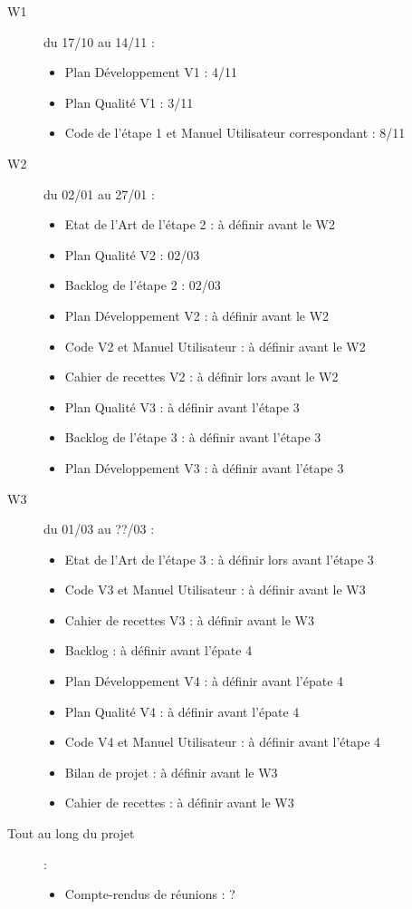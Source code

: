 \documentclass[10pt,a4paper]{article}
\begin{document}
\begin{description}

\item [W1] du 17/10 au 14/11 : 
\begin{itemize}
\item Plan Développement V1 : 4/11
\item Plan Qualité V1 : 3/11
\item Code de l'étape 1 et Manuel Utilisateur correspondant : 8/11
\end{itemize}

\item [W2] du 02/01 au 27/01  : 
\begin{itemize}
\item Etat de l'Art de l'étape 2 : à définir avant le W2
\item Plan Qualité V2 : 02/03
\item Backlog de l'étape 2 : 02/03
\item Plan Développement V2 : à définir avant le W2
\item Code V2 et Manuel Utilisateur : à définir avant le W2
\item Cahier de recettes V2 : à définir lors avant le W2
\item Plan Qualité V3 : à définir avant l'étape 3
\item Backlog de l'étape 3 : à définir avant l'étape 3
\item Plan Développement V3 : à définir avant l'étape 3
\end{itemize}

\item [W3] du 01/03 au ??/03  : 
\begin{itemize}
\item Etat de l'Art de l'étape 3  : à définir lors avant l'étape 3
\item Code V3 et Manuel Utilisateur : à définir avant le W3
\item Cahier de recettes V3 : à définir avant le W3
\item Backlog : à définir avant l'épate 4
\item Plan Développement V4 : à définir avant l'épate 4
\item Plan Qualité V4 : à définir avant l'épate 4
\item Code V4 et Manuel Utilisateur : à définir avant l'étape 4
\item Bilan de projet : à définir avant le W3
\item Cahier de recettes : à définir avant le W3
\end{itemize}

\item [Tout au long du projet] : 
\begin{itemize}
\item Compte-rendus de réunions : ?
\end{itemize}
\end{description}
\end{document}
